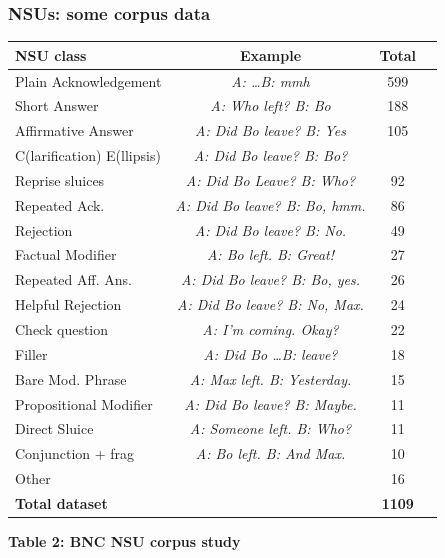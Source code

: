 \documentclass{beamer}
\begin{document}
\begin{frame}\frametitle{NSUs: some corpus data}

{\tiny
\begin{center}
\begin{tabular}{|lc||c||c||}\hline
{\bf NSU class}       &  {\bf Example} & {\bf Total} \\\hline
Plain Acknowledgement & \emph{A: \ldots B: mmh} & 599 \\
Short Answer    & \emph{A: Who left? B: Bo}      & 188 \\
Affirmative Answer  & \emph{A: Did Bo leave? B: Yes}  & 105 \\
C(larification) E(llipsis) &          \emph{   A: Did Bo leave? B:
  Bo?} &\\
Reprise sluices & \emph{A: Did Bo Leave? B: Who?}   & 92 \\
Repeated Ack. & \emph{A: Did Bo leave? B: Bo, hmm. }  & 86 \\
Rejection    &  \emph{ A: Did Bo leave? B: No. }     & 49 \\
Factual Modifier  &  \emph{ A: Bo left. B:  Great! }   & 27 \\
Repeated Aff. Ans.  & \emph{ A: Did Bo leave? B: Bo, yes. }   & 26 \\
Helpful Rejection     & \emph{ A: Did Bo leave? B: No, Max. } & 24 \\
Check question & \emph{A: I'm coming. Okay?} & 22 \\
Filler    & \emph{ A: Did Bo \ldots B: leave? }             & 18 \\
Bare Mod. Phrase &   \emph{ A: Max left. B: Yesterday. }   & 15 \\
Propositional Modifier & \emph{ A: Did Bo leave? B: Maybe. } &11 \\
Direct Sluice         & \emph{ A: Someone left. B: Who? }        & 11 \\
Conjunction + frag    & \emph{ A:  Bo left. B: And Max. } &10  \\
Other & & 16\\
\hline
{\bf Total dataset}  & & {\bf 1109}\\ \hline
\end{tabular}

\textbf{Table 2: BNC NSU corpus study } 

\end{center}
}
\end{frame}

\end{document}
